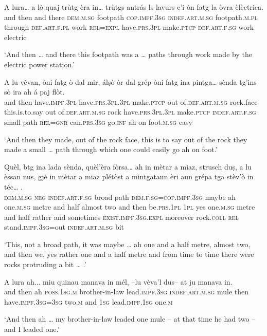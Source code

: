 \begin{linenumbers}
\gll A lura… a lò quaj trùtg èra in… trùtgs antrás ls lavurs c'i òn fatg la òvra èlèctrica.\\
and then  and there \textsc{dem.m.sg} footpath  \textsc{cop.impf.3sg} \textsc{indef.art.m.sg} footpath.\textsc{m.pl} through \textsc{def.art.f.pl}  work \textsc{rel=expl} have.\textsc{prs.3pl} make.\textsc{ptcp} \textsc{def.art.f.sg} work electric \\
\end{linenumbers}
\medskip
\glt `And then … and there this footpath was a … paths through work made by the electric power station.'
\medskip

\begin{linenumbers}
\gll  A lu vèvan, òni fatg ò dal mir, álṣò òr dal grép òni fatg ina pintga…  sènda tg’ins sò ira ah á paj flòt.\\
and then have.\textsc{impf.3pl} have.\textsc{prs.3pl.3pl} make.\textsc{ptcp} out of.\textsc{def.art.m.sg} rock.face this.is.to.say out of.\textsc{def.art.m.sg} rock have.\textsc{prs.3pl.3pl} make.\textsc{ptcp} \textsc{indef.art.f.sg} small path \textsc{rel=gnr} can.\textsc{prs.3sg} go.\textsc{inf} ah on foot.\textsc{m.sg} easy \\
\end{linenumbers}
\medskip
\glt `And then they made, out of the rock face, this is to say out of the rock they made a small … path through which one could easily go ah on foot.'
\medskip

\begin{linenumbers}
\gll   Quèl, btg ina lada sènda, quèl’èra fòrsa… ah in mètar a miaz, strusch duṣ, a lu èssan nus, gjè in mètar a miaz plétòst a mintgataun èri aun grépa tga stèv’ò in téc… . \\
 \textsc{dem.m.sg} \textsc{neg} \textsc{indef.art.f.sg} broad path \textsc{dem.f.sg=cop.impf.3sg} maybe ah one.\textsc{m.sg} metre and half almost two and then  be.\textsc{prs.1pl} \textsc{1pl} yes one.\textsc{m.sg} metre and half rather and sometimes  \textsc{exist.impf.3sg.expl} moreover  rock.\textsc{coll} \textsc{rel}  stand.\textsc{impf.3sg=}out \textsc{indef.art.m.sg} bit   \\
\end{linenumbers}
\medskip
\glt `This, not a broad path, it was maybe … ah one and a half metre, almost two, and then we, yes rather one and a half metre and from time to time there were rocks protruding a bit … .'
\medskip

\begin{linenumbers}
\gll   A lura ah... miu quinau manava in mél, –lu vèva’l dus– at ju manava in. \\
and then ah \textsc{poss.1sg.m} brother-in-law lead.\textsc{impf.3sg} \textsc{indef.art.m.sg} mule then have.\textsc{impf.3sg=3sg}  two.\textsc{m} and \textsc{1sg} lead.\textsc{impf.1sg} one.\textsc{m} \\
\end{linenumbers}
\medskip
\glt `And then ah … my brother-in-law leaded one mule – at that time he had two – and I leaded one.'
\medskip

